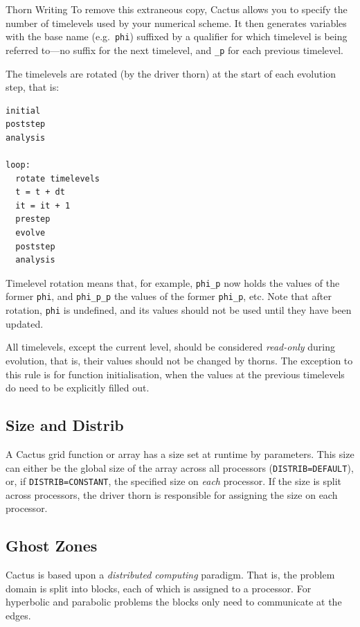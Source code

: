 \begin{cactuspart}{Thorn Writing}
To remove this extraneous copy, Cactus allows you to specify the number
of timelevels used by your numerical scheme.  It then generates variables
with the base name (e.g.\ \texttt{phi}) suffixed by a qualifier for
which timelevel is being referred to---no suffix for the
next timelevel, and \texttt{\_p} for each previous timelevel.

The timelevels are rotated (by the driver thorn) at the start
of each evolution step, that is:
\begin{verbatim}
initial
poststep
analysis

loop:
  rotate timelevels
  t = t + dt
  it = it + 1
  prestep
  evolve
  poststep
  analysis
\end{verbatim}

Timelevel rotation means that, for example,
\texttt{phi\_p} now holds the values of the former \texttt{phi},
and \texttt{phi\_p\_p} the values of the former \texttt{phi\_p}, etc.
Note that after rotation, \texttt{phi} is  undefined, and its values should
not be used until they have been updated.

All timelevels, except the current level, should be considered \emph{read-only} during evolution, that is, their values should not be changed by thorns.
The exception to this rule is for function initialisation, when the
values at the previous timelevels do need to be explicitly filled out.


\subsection{Size and Distrib}

A Cactus grid function or array has a size set at runtime by parameters.
This size can either be the global size of the array across all processors
(\texttt{DISTRIB=DEFAULT}),
or, if \texttt{DISTRIB=CONSTANT}, the specified
size on \emph{each} processor.
If the size is split across processors, the driver thorn is
responsible for assigning the size on each processor.


\subsection{Ghost Zones}
\label{sec:ghost_size}

Cactus is based upon a \textit{distributed computing} paradigm.  That is,
the problem domain is split into blocks, each of which is assigned to
a processor.  For hyperbolic and parabolic problems the blocks only
need to communicate at the edges.


\end{cactuspart}
